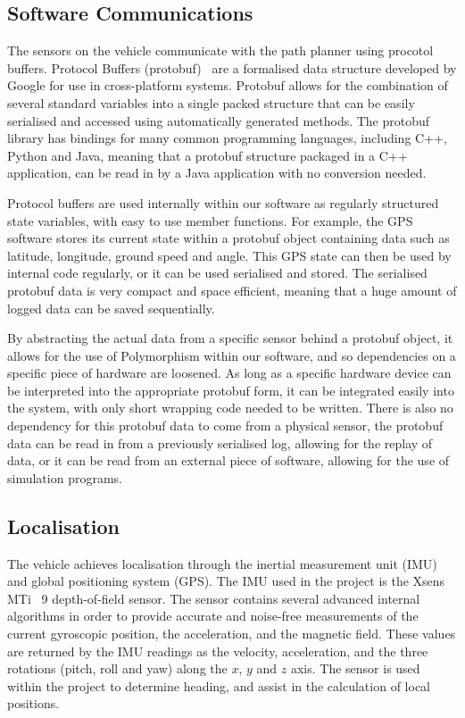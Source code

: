 \subsection{Software Communications}
The sensors on the vehicle communicate with the path planner using procotol buffers. Protocol Buffers (protobuf)~\cite{google_developers_protocol_nodate} are a formalised data structure developed by Google for use in cross-platform systems. Protobuf allows for the combination of several standard variables into a single packed structure that can be easily serialised and accessed using automatically generated methods. The protobuf library has bindings for many common programming languages, including C++, Python and Java, meaning that a protobuf structure packaged in a C++ application, can be read in by a Java application with no conversion needed. 


Protocol buffers are used internally within our software as regularly structured state variables, with easy to use member functions. For example, the GPS software stores its current state within a protobuf object containing data such as latitude, longitude, ground speed and angle. This GPS state can then be used by internal code regularly, or it can be used serialised and stored.  The serialised protobuf data is very compact and space efficient, meaning that a huge amount of logged data can be saved sequentially. 

By abstracting the actual data from a specific sensor behind a protobuf object, it allows for the use of Polymorphism within our software, and so dependencies on a specific piece of hardware are loosened. As long as a specific hardware device can be interpreted into the appropriate protobuf form,  it can be integrated easily into the system, with only short wrapping code needed to be written. There is also no dependency for this protobuf data to come from a physical sensor, the protobuf data can be read in from a previously serialised log, allowing for the replay of data, or it can be read from an external piece of software, allowing for the use of simulation programs.

\subsection{Localisation}
The vehicle achieves localisation through the inertial measurement unit (IMU) and global positioning system (GPS). The IMU used in the project is the Xsens MTi~\cite{xsens_mti_nodate} 9 depth-of-field sensor. The sensor contains several advanced internal algorithms in order to provide accurate and noise-free measurements of the current gyroscopic position, the acceleration, and the magnetic field. These values are returned by the IMU readings as the velocity, acceleration, and the three rotations (pitch, roll and yaw) along the $x$, $y$ and $z$ axis. The sensor is used within the project to determine heading, and assist in the calculation of local positions. 

